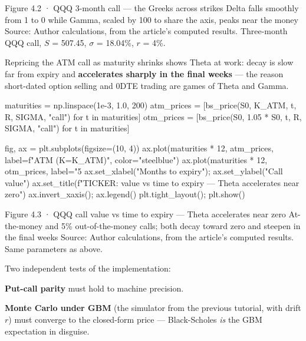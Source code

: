 \documentclass{pyportfolios-note}
\begin{document}
  {Figure 4.2 · QQQ 3-month call — the Greeks across strikes}
  {Delta falls smoothly from 1 to 0 while Gamma, scaled by 100 to share the
   axis, peaks near the money}
  {Source: Author calculations, from the article's computed results. Three-month
   QQQ call, $S$ = 507.45, $\sigma$ = 18.04\%, $r$ = 4\%.}


Repricing the ATM call as maturity shrinks shows Theta at work: decay is slow far
from expiry and \textbf{accelerates sharply in the final weeks} — the reason
short-dated option selling and 0DTE trading are games of Theta and Gamma.

\begin{notecode}
maturities = np.linspace(1e-3, 1.0, 200)
atm_prices  = [bs_price(S0, K_ATM, t, R, SIGMA, "call") for t in maturities]
otm_prices  = [bs_price(S0, 1.05 * S0, t, R, SIGMA, "call") for t in maturities]

fig, ax = plt.subplots(figsize=(10, 4))
ax.plot(maturities * 12, atm_prices, label=f"ATM (K={K_ATM})", color="steelblue")
ax.plot(maturities * 12, otm_prices, label="5%
ax.set_xlabel("Months to expiry"); ax.set_ylabel("Call value")
ax.set_title(f"{TICKER}: value vs time to expiry — Theta accelerates near zero")
ax.invert_xaxis(); ax.legend()
plt.tight_layout(); plt.show()
\end{notecode}

  {Figure 4.3 · QQQ call value vs time to expiry — Theta accelerates near zero}
  {At-the-money and 5\% out-of-the-money calls; both decay toward zero and
   steepen in the final weeks}
  {Source: Author calculations, from the article's computed results. Same
   parameters as above.}


Two independent tests of the implementation:

\begin{notebullets}
\item \textbf{Put-call parity} must hold to machine precision.
\item \textbf{Monte Carlo under GBM} (the simulator from the previous tutorial,
      with drift $r$) must converge to the closed-form price — Black-Scholes
      \textit{is} the GBM expectation in disguise.
\end{notebullets}
\end{document}
